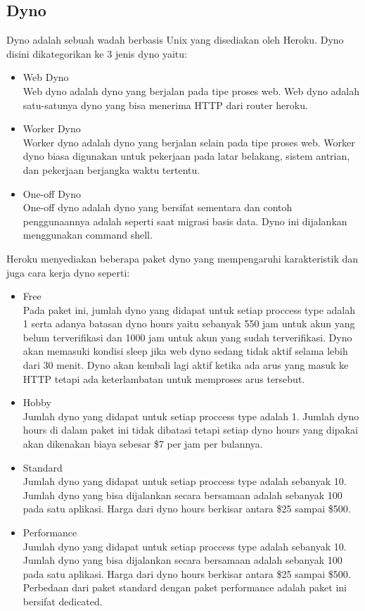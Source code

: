 \subsection{Dyno}
Dyno adalah sebuah wadah berbasis Unix yang disediakan oleh Heroku. Dyno disini dikategorikan ke 3 jenis dyno yaitu:
\begin{itemize}
    \item Web Dyno \\ 
    Web dyno adalah dyno yang berjalan pada tipe proses web. Web dyno adalah satu-satunya dyno yang bisa menerima HTTP dari router heroku. 
    \item Worker Dyno \\ 
    Worker dyno adalah dyno yang berjalan selain pada tipe proses web. Worker dyno biasa digunakan untuk pekerjaan pada latar belakang, sistem antrian, dan pekerjaan berjangka waktu tertentu. 
    \item One-off Dyno \\ 
    One-off dyno adalah dyno yang bersifat sementara dan contoh penggunaannya adalah seperti saat migrasi basis data. Dyno ini dijalankan menggunakan command shell. 
\end{itemize}
Heroku menyediakan beberapa paket dyno yang mempengaruhi karakteristik dan juga cara kerja dyno seperti:
\begin{itemize}
    \item Free \\ 
    Pada paket ini, jumlah dyno yang didapat untuk setiap proccess type adalah 1 serta adanya batasan dyno hours yaitu sebanyak 550 jam untuk akun yang belum terverifikasi dan 1000 jam untuk akun yang sudah terverifikasi. Dyno akan memasuki kondisi sleep jika web dyno sedang tidak aktif selama lebih dari 30 menit. Dyno akan kembali lagi aktif ketika ada arus yang masuk ke HTTP tetapi ada keterlambatan untuk memproses arus tersebut.  
    \item Hobby \\ 
    Jumlah dyno yang didapat untuk setiap proccess type adalah 1. Jumlah dyno hours di dalam paket ini tidak dibatasi tetapi setiap dyno hours yang dipakai akan dikenakan biaya sebesar \$7 per jam per bulannya.  
    \item Standard \\
    Jumlah dyno yang didapat untuk setiap proccess type adalah sebanyak 10. Jumlah dyno yang bisa dijalankan secara bersamaan adalah sebanyak 100 pada satu aplikasi. Harga dari dyno hours berkisar antara \$25 sampai \$500. 
    \item Performance \\
    Jumlah dyno yang didapat untuk setiap proccess type adalah sebanyak 10. Jumlah dyno yang bisa dijalankan secara bersamaan adalah sebanyak 100 pada satu aplikasi. Harga dari dyno hours berkisar antara \$25 sampai \$500. Perbedaan dari paket standard dengan paket performance adalah paket ini bersifat dedicated. 
\end{itemize}


